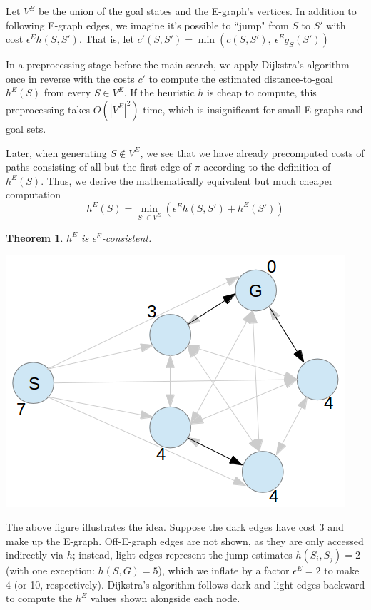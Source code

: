 \documentclass[letterpaper]{article}
\newtheorem{thm}{Theorem}
\begin{document}
Let $V^E$ be the union of the goal states and the E-graph's vertices.
In addition to following E-graph edges, we imagine it's possible to ``jump" from $S$ to $S'$ with cost $\epsilon^E h(S,S')$. That is, let $c'(S,S') = \min\left(c(S,S'),~\epsilon^E g_S(S')\right)$


In a preprocessing stage before the main search, we apply Dijkstra's algorithm once in reverse with the costs $c'$ to compute the estimated distance-to-goal $h^E(S)$ from every $S\in V^E$. If the heuristic $h$ is cheap to compute, this preprocessing takes $O(|V^E|^2)$ time, which is insignificant for small E-graphs and goal sets.

Later, when generating $S \notin V^E$, we see that we have already precomputed costs of paths consisting of all but the first edge of $\pi$ according to the definition of $h^E(S)$. Thus, we derive the mathematically equivalent but much cheaper computation
\[h^E(S) = \min_{S'\in V^E} \left(\epsilon^E h(S,S') + h^E(S')\right)\]

\begin{thm}$h^E$ is $\epsilon^E$-consistent. \cite{phillips2012graphs}\end{thm}

\includegraphics[scale=0.4]{Pentagon.png}

The above figure illustrates the idea. Suppose the dark edges have cost 3 and make up the E-graph. Off-E-graph edges are not shown, as they are only accessed indirectly via $h$; instead, light edges represent the jump estimates $h(S_i,S_j) = 2$ (with one exception: $h(S,G) = 5$), which we inflate by a factor $\epsilon^E=2$ to make 4 (or 10, respectively). Dijkstra's algorithm follows dark and light edges backward to compute the $h^E$ values shown alongside each node.
\end{document}
